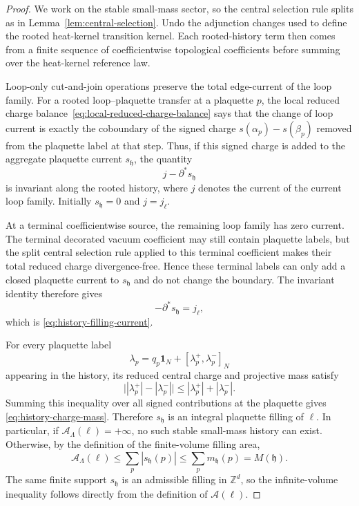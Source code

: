 \documentclass[11pt,a4paper,reqno]{amsart}
\theoremstyle{definition}
\theoremstyle{remark}
\newcommand\Z{{\mathbb{Z}}}
\begin{document}
\begin{proof}
We work on the stable small-mass sector, so the central selection rule splits as in Lemma~\ref{lem:central-selection}. Undo the adjunction changes used to define the rooted heat-kernel transition kernel. Each rooted-history term then comes from a finite sequence of coefficientwise topological coefficients before summing over the heat-kernel reference law.

Loop-only cut-and-join operations preserve the total edge-current of the loop family.  For a rooted loop--plaquette transfer at a plaquette $p$, the local reduced charge balance~\eqref{eq:local-reduced-charge-balance} says that the change of loop current is exactly the coboundary of the signed charge $s(\alpha_p)-s(\beta_p)$ removed from the plaquette label at that step.  Thus, if this signed charge is added to the aggregate plaquette current $s_{\mathfrak h}$, the quantity
\[
j-\partial^*s_{\mathfrak h}
\]
is invariant along the rooted history, where $j$ denotes the current of the current loop family.  Initially $s_{\mathfrak h}=0$ and $j=j_\ell$.

At a terminal coefficientwise source, the remaining loop family has zero current.  The terminal decorated vacuum coefficient may still contain plaquette labels, but the split central selection rule applied to this terminal coefficient makes their total reduced charge divergence-free.  Hence these terminal labels can only add a closed plaquette current to $s_{\mathfrak h}$ and do not change the boundary.  The invariant identity therefore gives
\[
-\partial^*s_{\mathfrak h}=j_\ell,
\]
which is \eqref{eq:history-filling-current}.

For every plaquette label
\[
\lambda_p=q_p\mathbf 1_N+[\lambda_p^+,\lambda_p^-]_N
\]
appearing in the history, its reduced central charge and projective mass satisfy
\[
\bigl||\lambda_p^+|-|\lambda_p^-|\bigr|
\le |\lambda_p^+|+|\lambda_p^-|.
\]
Summing this inequality over all signed contributions at the plaquette gives \eqref{eq:history-charge-mass}. Therefore $s_{\mathfrak h}$ is an integral plaquette filling of $\ell$. In particular, if $\mathcal A_\Lambda(\ell)=+\infty$, no such stable small-mass history can exist. Otherwise, by the definition of the finite-volume filling area,
\[
\mathcal A_\Lambda(\ell)
\le \sum_p |s_{\mathfrak h}(p)|
\le \sum_p m_{\mathfrak h}(p)
=M(\mathfrak h).
\]
The same finite support $s_{\mathfrak h}$ is an admissible filling in $\Z^d$, so the infinite-volume inequality follows directly from the definition of $\mathcal A(\ell)$.
\end{proof}
\end{document}
